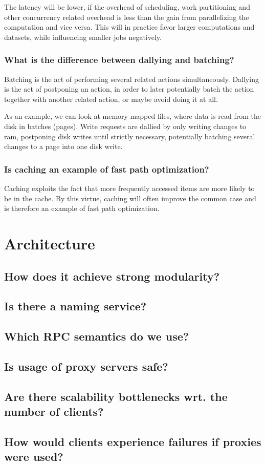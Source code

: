 \documentclass[11pt,a4paper]{article}
\begin{document}
The latency will be lower, if the overhead of scheduling, work partitioning and
other concurrency related overhead is less than the gain from parallelizing the
computation and vice versa. This will in practice favor larger computations and
datasets, while influencing smaller jobs negatively.

\subsubsection{What is the difference between dallying and batching?}

Batching is the act of performing several related actions simultaneously.
Dallying is the act of postponing an action, in order to later potentially batch
the action together with another related action, or maybe avoid doing it at all.

As an example, we can look at memory mapped files, where data is read from the
disk in batches (pages).
Write requests are dallied by only writing changes to ram, postponing disk
writes until strictly necessary, potentially batching several changes to a page
into one disk write.

\subsubsection{Is caching an example of fast path optimization?}

Caching exploits the fact that more frequently accessed items are more likely
to be in the cache. By this virtue, caching will often improve the common case
and is therefore an example of fast path optimization.

\section{Architecture}

\subsection{How does it achieve strong modularity?}

\subsection{Is there a naming service?}

\subsection{Which RPC semantics do we use?}

\subsection{Is usage of proxy servers safe?}

\subsection{Are there scalability bottlenecks wrt. the number of clients?}

\subsection{How would clients experience failures if proxies were used?}
\end{document}
